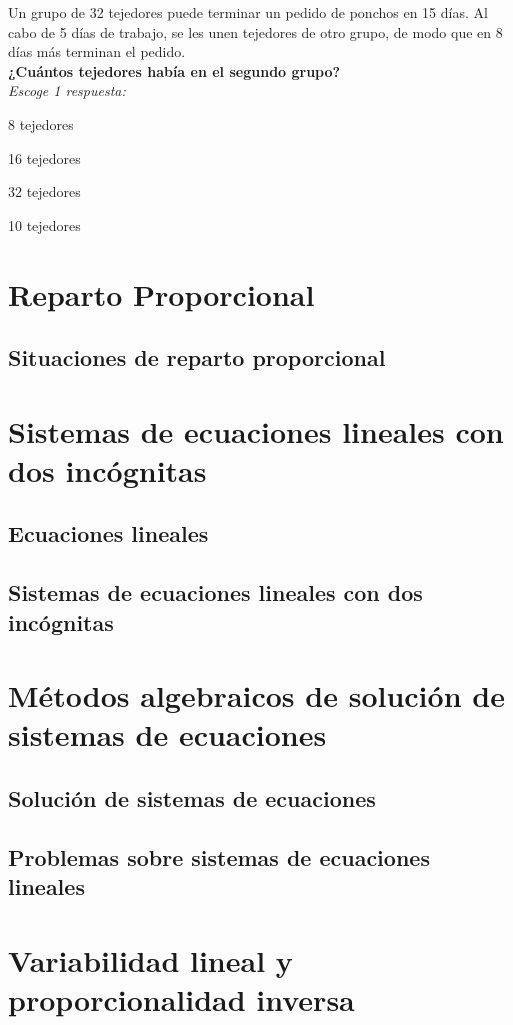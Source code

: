 \documentclass[11pt]{book}
\newenvironment{questions}[1][]{\enumerate[,#1]}{\endenumerate}
\newcommand{\choice}{\item}
\begin{document}
\begin{questions}[start=1]
  \question[10] Un grupo de 32 tejedores puede terminar un pedido de ponchos en 15 días. Al cabo de 5 días de trabajo, se les unen tejedores de otro grupo, de modo que en 8 días más terminan el pedido.\\
  \textbf{¿Cuántos tejedores había en el segundo grupo?}\\
  \emph{Escoge 1 respuesta:}\\
  \begin{oneparchoices}
    \choice 8 tejedores
    \choice 16 tejedores
    \choice 32 tejedores
    \choice 10 tejedores
  \end{oneparchoices}
\end{questions}

\section{Reparto Proporcional}
\subsection{Situaciones de reparto proporcional}

\section{Sistemas de ecuaciones lineales con dos inc\'ognitas}
\subsection{Ecuaciones lineales}
\subsection{Sistemas de ecuaciones lineales con dos inc\'ognitas}

\section{M\'etodos algebraicos de soluci\'on de sistemas de ecuaciones}
\subsection{Soluci\'on de sistemas de ecuaciones}
\subsection{Problemas sobre sistemas de ecuaciones lineales}

\section{Variabilidad lineal y proporcionalidad inversa}
\end{document}
